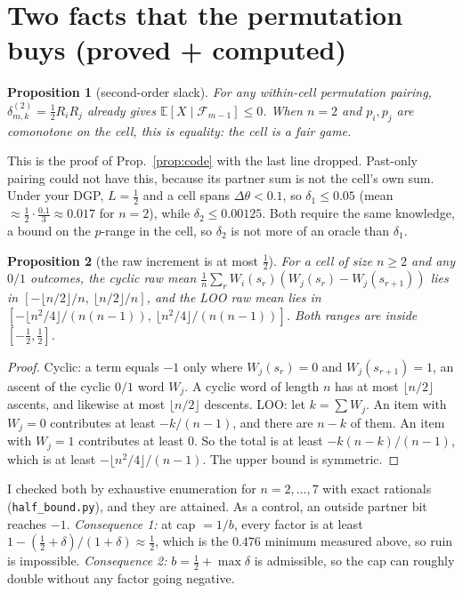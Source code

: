 \documentclass[11pt]{article}
\newtheorem{proposition}{Proposition}
\newcommand{\E}{\mathbb{E}}
\newcommand{\Fc}{\mathcal{F}}
\begin{document}
\section{Two facts that the permutation buys (proved + computed)}
\begin{proposition}[second-order slack]\label{prop:second}
For any within-cell permutation pairing, $\delta^{(2)}_{m,k}=\tfrac12R_iR_j$ already gives $\E[X\mid\Fc_{m-1}]\le0$.
When $n=2$ and $p_i,p_j$ are comonotone on the cell, this is equality: the cell is a fair game.
\end{proposition}
This is the proof of Prop.~\ref{prop:code} with the last line dropped. Past-only pairing could not have this, because its partner sum is not the cell's own sum.
Under your DGP, $L=\tfrac12$ and a cell spans $\Delta\theta<0.1$, so $\delta_1\le0.05$ (mean $\approx\tfrac12\cdot\tfrac{0.1}{3}\approx0.017$ for $n=2$), while $\delta_2\le0.00125$.
Both require the same knowledge, a bound on the $p$-range in the cell, so $\delta_2$ is not more of an oracle than $\delta_1$.

\begin{proposition}[the raw increment is at most $\frac12$]\label{prop:half}
For a cell of size $n\ge2$ and any $0/1$ outcomes, the cyclic raw mean $\frac1n\sum_r W_i(s_r)(W_j(s_r)-W_j(s_{r+1}))$ lies in $[-\lfloor n/2\rfloor/n,\ \lfloor n/2\rfloor/n]$, and the LOO raw mean lies in $[-\lfloor n^2/4\rfloor/(n(n-1)),\ \lfloor n^2/4\rfloor/(n(n-1))]$. Both ranges are inside $[-\tfrac12,\tfrac12]$.
\end{proposition}
\begin{proof}
Cyclic: a term equals $-1$ only where $W_j(s_r)=0$ and $W_j(s_{r+1})=1$, an ascent of the cyclic $0/1$ word $W_j$. A cyclic word of length $n$ has at most $\lfloor n/2\rfloor$ ascents, and likewise at most $\lfloor n/2\rfloor$ descents.
LOO: let $k=\sum W_j$. An item with $W_j=0$ contributes at least $-k/(n-1)$, and there are $n-k$ of them. An item with $W_j=1$ contributes at least $0$. So the total is at least $-k(n-k)/(n-1)$, which is at least $-\lfloor n^2/4\rfloor/(n-1)$. The upper bound is symmetric.
\end{proof}
I checked both by exhaustive enumeration for $n=2,\dots,7$ with exact rationals (\texttt{half\_bound.py}), and they are attained. As a control, an outside partner bit reaches $-1$.
\emph{Consequence 1:} at cap $=1/b$, every factor is at least $1-(\tfrac12+\delta)/(1+\delta)\approx\tfrac12$, which is the $0.476$ minimum measured above, so ruin is impossible.
\emph{Consequence 2:} $b=\tfrac12+\max\delta$ is admissible, so the cap can roughly double without any factor going negative.
\end{document}
